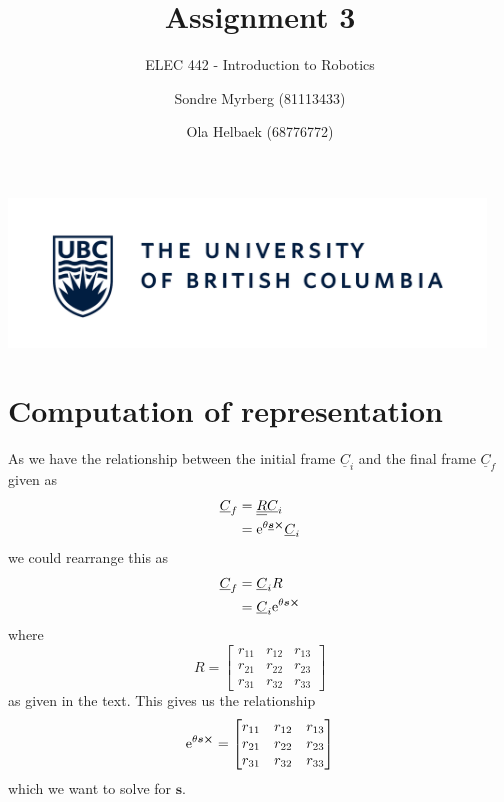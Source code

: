 \documentclass[a4paper]{scrartcl}
\title{Assignment 3}
\subtitle{ELEC 442 - Introduction to Robotics}
\author{Sondre Myrberg (81113433) \and Ola Helbaek (68776772)}
\newcommand{\me}[1]{\mathrm{e}^{#1}}
\begin{document}
\hypersetup{pageanchor=false}
\begin{titlepage}
    \maketitle
    \vfill
    \vfill
    \vfill
    \vfill
    \includegraphics[width=0.95\textwidth]{../../ubc_logo.pdf}
    \vfill
    \vfill
\end{titlepage}
\hypersetup{pageanchor=true}

\section{Computation of representation}

As we have the relationship between the initial frame $\underline{C}_i$ and the final frame $\underline{C}_f$ given as
\begin{equation}
    \begin{aligned}
        \underline{C}_f &= \underline{\underline{R}}\underline{C}_i\\
        &= \me{\theta \underline{\bm{s}}\cross}\underline{C}_i
    \end{aligned}
\end{equation}
we could rearrange this as
\begin{equation}
    \begin{aligned}
        \underline{C}_f &= \underline{C}_i R\\
         &= \underline{C}_i \me{\theta\bm{s}\cross}
    \end{aligned}
\end{equation}
where
\begin{equation}
    R = \begin{bmatrix}
        r_{11} & r_{12} & r_{13} \\  r_{21} & r_{22} & r_{23} \\  r_{31} & r_{32} & r_{33}
    \end{bmatrix}
\end{equation}
as given in the text. This gives us the relationship
\begin{equation}
    \begin{aligned}
        \me{\theta\bm{s}\cross} = \begin{bmatrix}
        r_{11} & r_{12} & r_{13} \\  r_{21} & r_{22} & r_{23} \\  r_{31} & r_{32} & r_{33}
    \end{bmatrix}
    \end{aligned}
\end{equation}
which we want to solve for $\bm{s}$.
\end{document}
